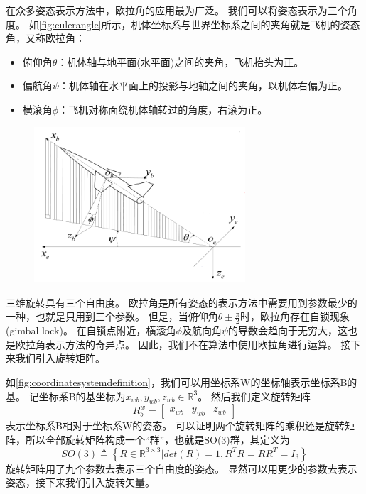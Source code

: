 \documentclass[
  type=master
]{gdutthesis}
\begin{document}
在众多姿态表示方法中，欧拉角的应用最为广泛\cite{stuelpnagel1964parametrization}。
我们可以将姿态表示为三个角度。
如\autoref{fig:eulerangle}所示，机体坐标系与世界坐标系之间的夹角就是飞机的姿态角，又称欧拉角：
\begin{itemize}
	\item 俯仰角$\theta$：机体轴与地平面(水平面)之间的夹角，飞机抬头为正。
	\item 偏航角$\psi$：机体轴在水平面上的投影与地轴之间的夹角，以机体右偏为正。
	\item 横滚角$\phi$：飞机对称面绕机体轴转过的角度，右滚为正。
\end{itemize}
\begin{figure}[htbp]
	\centering
	\includegraphics[width=0.7\textwidth]{屏幕截图 2022-03-31 231147.png}
	\label{fig:eulerangle}
\end{figure}
三维旋转具有三个自由度。
欧拉角是所有姿态的表示方法中需要用到参数最少的一种，也就是只用到三个参数。
但是，当俯仰角$\theta \pm \frac{\pi}{2}$时，欧拉角存在自锁现象(gimbal lock)。
在自锁点附近，横滚角$\phi$及航向角$\psi$的导数会趋向于无穷大，这也是欧拉角表示方法的奇异点。
因此，我们不在算法中使用欧拉角进行运算。
接下来我们引入旋转矩阵。

如\autoref{fig:coordinatesystemdefinition}，我们可以用坐标系W的坐标轴表示坐标系B的基。
记坐标系B的基坐标为$x_{wb}, y_{wb}, z_{wb} \in \mathbb{R}^3$。
然后我们定义旋转矩阵
\begin{equation}\label{eq:rotationmatrixdefinition}
R_b^w = 
\begin{bmatrix}
x_{wb} & y_{wb} & z_{wb}
\end{bmatrix}
\end{equation}
表示坐标系B相对于坐标系W的姿态。
可以证明两个旋转矩阵的乘积还是旋转矩阵，所以全部旋转矩阵构成一个“群”，也就是SO(3)群，其定义为
\begin{equation}\label{eq:so3}
SO(3) \triangleq \left\{ R \in \mathbb{R}^{3 \times 3} | det(R) = 1, R^T R = R R^T = I_3 \right\}
\end{equation}
旋转矩阵用了九个参数去表示三个自由度的姿态。
显然可以用更少的参数去表示姿态，接下来我们引入旋转矢量。
\end{document}
